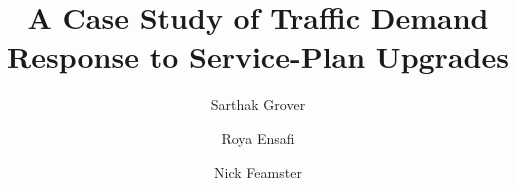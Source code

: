 \documentclass{llncs}
\begin{document}
\begin{sloppypar}

\mainmatter 

\title{A Case Study of Traffic Demand Response to Service-Plan Upgrades}

\author{Sarthak Grover \and Roya Ensafi \and Nick Feamster}


\maketitle












\balance\label{lastpage}


\end{sloppypar}



\small
\setlength{\parskip}{-1pt}
\setlength{\itemsep}{-1pt}
\balance

\end{document}
